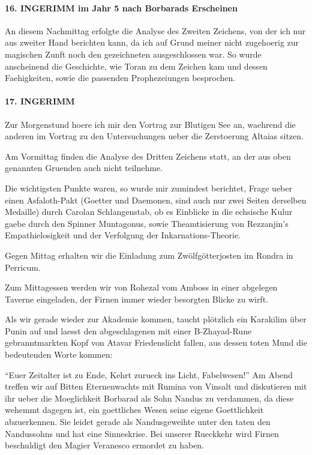 \paragraph{16. INGERIMM im Jahr 5 nach Borbarads Erscheinen}
An diesem Nachmittag erfolgte die Analyse des Zweiten Zeichens, von der ich nur aus zweiter Hand berichten kann, da ich auf Grund meiner nicht zugehoerig zur magischen Zunft noch den gezeichneten ausgeschlossen war. So wurde anscheinend die Geschichte, wie Toran zu dem Zeichen kam und dessen Faehigkeiten, sowie die passenden Prophezeiungen besprochen.

\paragraph{17. INGERIMM}
Zur Morgenstund hoere ich mir den Vortrag zur Blutigen See an, waehrend die anderen im Vortrag zu den Untersuchungen ueber die Zerstoerung Altaias sitzen.

Am Vormittag finden die Analyse des Dritten Zeichens statt, an der aus oben genannten Gruenden auch nicht teilnehme.

Die wichtigsten Punkte waren, so wurde mir zumindest berichtet, Frage ueber einen Asfaloth-Pakt (Goetter und Daemonen, sind auch nur zwei Seiten derselben Medaille) durch Carolan Schlangenstab, ob es Einblicke in die echsische Kulur gaebe durch den Spinner Muntagonus, sowie Theamtisierung von Rezzanjin's Empathielosigkeit und der Verfolgung der Inkarnations-Theorie.

Gegen Mittag erhalten wir die Einladung zum Zwölfgötterjosten im Rondra in Perricum.

Zum Mittagessen werden wir von Rohezal vom Amboss in einer abgelegen Taverne eingeladen, der Firnen immer wieder besorgten Blicke zu wirft.

Als wir gerade wieder zur Akademie kommen, taucht plötzlich ein Karakilim über Punin auf und laesst den abgeschlagenen mit einer B-Zhayad-Rune gebranntmarkten Kopf von Atavar Friedenslicht fallen, aus dessen toten Mund die bedeutenden Worte kommen:

``Euer Zeitalter ist zu Ende, Kehrt zurueck ins Licht, Fabelwesen!''
Am Abend treffen wir auf Bitten Eternenwachts mit Rumina von Vinsalt und diskutieren mit ihr ueber die Moeglichkeit Borbarad als Sohn Nandus zu verdammen, da diese wehemmt dagegen ist, ein goettliches Wesen seine eigene Goettlichkeit abzuerkennen. Sie leidet gerade als Nandusgeweihte unter den taten den Nandussohns und hat eine Sinneskrise.
Bei unserer Rueckkehr wird Firnen beschuldigt den Magier Veranesco ermordet zu haben.

